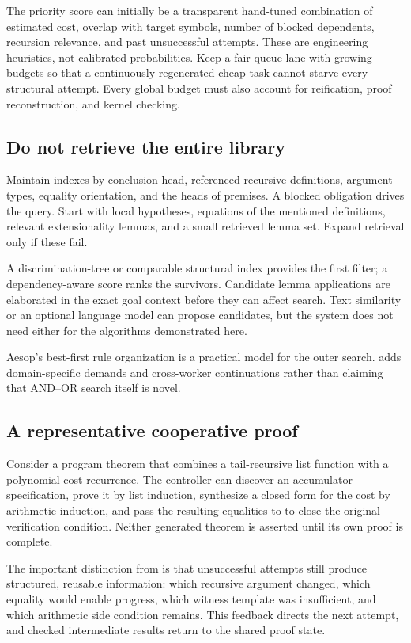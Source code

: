 The priority score can initially be a transparent hand-tuned combination of
estimated cost, overlap with target symbols, number of blocked dependents,
recursion relevance, and past unsuccessful attempts. These are engineering
heuristics, not calibrated probabilities. Keep a fair queue lane with growing
budgets so that a continuously regenerated cheap task cannot starve every
structural attempt. Every global budget must also account for reification,
proof reconstruction, and kernel checking.

\subsection{Do not retrieve the entire library}

Maintain indexes by conclusion head, referenced recursive definitions,
argument types, equality orientation, and the heads of premises. A blocked
obligation drives the query. Start with local hypotheses, equations of the
mentioned definitions, relevant extensionality lemmas, and a small retrieved
lemma set. Expand retrieval only if these fail.

A discrimination-tree or comparable structural index provides the first
filter; a dependency-aware score ranks the survivors. Candidate lemma
applications are elaborated in the exact goal context before they can affect
search. Text similarity or an optional language model can propose candidates,
but the system does not need either for the algorithms demonstrated here.

Aesop's best-first rule organization is a practical model for the outer search.
\Forge{} adds domain-specific demands and cross-worker continuations rather
than claiming that AND--OR search itself is novel.\cite{aesop}

\subsection{A representative cooperative proof}

Consider a program theorem that combines a tail-recursive list function with
a polynomial cost recurrence. The controller can discover an accumulator
specification, prove it by list induction, synthesize a closed form for the
cost by arithmetic induction, and pass the resulting equalities to \Grind{}
to close the original verification condition. Neither generated theorem is
asserted until its own proof is complete.

The important distinction from
 is that unsuccessful attempts still
produce structured, reusable information: which recursive argument changed,
which equality would enable progress, which witness template was insufficient,
and which arithmetic side condition remains. This feedback directs the next
attempt, and checked intermediate results return to the shared proof state.
